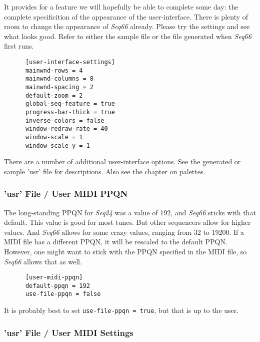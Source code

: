    It provides for a feature we will hopefully be able to complete some day:
   the complete specificition of the appearance of the user-interface.
   There is plenty of room to change the appearance of
   \textsl{Seq66} already.
   Please try the settings and see what looks good.
   Refer to either the sample file or the file generated when \textsl{Seq66}
   first runs.

   \begin{verbatim}
      [user-interface-settings]
      mainwnd-rows = 4
      mainwnd-columns = 8
      mainwnd-spacing = 2
      default-zoom = 2
      global-seq-feature = true
      progress-bar-thick = true
      inverse-colors = false
      window-redraw-rate = 40
      window-scale = 1
      window-scale-y = 1
   \end{verbatim}

   There are a number of additional user-interface options.  See the generated
   or sample 'usr' file for descriptions.  Also see the chapter on palettes.

\subsubsection{'usr' File / User MIDI PPQN}
\label{subsubsec:usr_file_user_midi_ppqn}

   The long-standing PPQN for \textsl{Seq24} was a value of 192, and
   \textsl{Seq66} sticks with that default.
   This value is good for most tunes. But other sequencers allow for higher
   values. And \textsl{Seq66} allows for some crazy values, ranging from
   32 to 19200.  If a MIDI file has a different PPQN, it will be rescaled to
   the default PPQN.  However, one might want to stick with the PPQN
   specified in the MIDI file, so \textsl{Seq66} allows that as well.

   \begin{verbatim}
      [user-midi-ppqn]
      default-ppqn = 192
      use-file-ppqn = false
   \end{verbatim}

   It is probably best to set \texttt{use-file-ppqn = true}, but that is
   up to the user.

\subsubsection{'usr' File / User MIDI Settings}
\label{subsubsec:usr_file_user_midi_settings}

